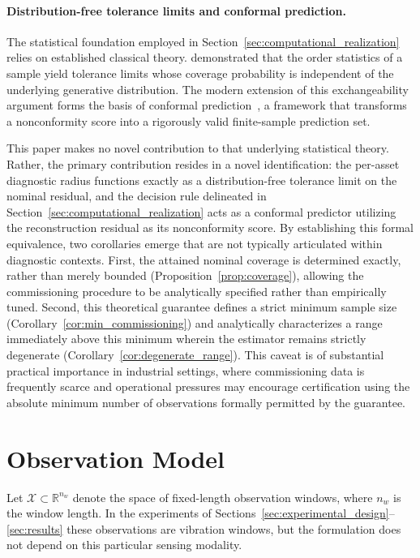\documentclass[a4paper]{cas-sc}
\newcommand{\X}{\ensuremath{\mathcal{X}}}
\newcommand{\R}{\ensuremath{\mathbb{R}}}
\begin{document}
\paragraph{Distribution-free tolerance limits and conformal prediction.}
The statistical foundation employed in Section~\ref{sec:computational_realization} relies on established classical theory. \citet{wilks1941} demonstrated that the order statistics of a sample yield tolerance limits whose coverage probability is independent of the underlying generative distribution. The modern extension of this exchangeability argument forms the basis of conformal prediction~\citep{vovk2005,shafer2008,papadopoulos2002,lei2018}, a framework that transforms a nonconformity score into a rigorously valid finite-sample prediction set.

This paper makes no novel contribution to that underlying statistical theory. Rather, the primary contribution resides in a novel identification: the per-asset diagnostic radius functions exactly as a distribution-free tolerance limit on the nominal residual, and the decision rule delineated in Section~\ref{sec:computational_realization} acts as a conformal predictor utilizing the reconstruction residual as its nonconformity score. By establishing this formal equivalence, two corollaries emerge that are not typically articulated within diagnostic contexts. First, the attained nominal coverage is determined exactly, rather than merely bounded (Proposition~\ref{prop:coverage}), allowing the commissioning procedure to be analytically specified rather than empirically tuned. Second, this theoretical guarantee defines a strict minimum sample size (Corollary~\ref{cor:min_commissioning}) and analytically characterizes a range immediately above this minimum wherein the estimator remains strictly degenerate (Corollary~\ref{cor:degenerate_range}). This caveat is of substantial practical importance in industrial settings, where commissioning data is frequently scarce and operational pressures may encourage certification using the absolute minimum number of observations formally permitted by the guarantee.

\section{Observation Model}
\label{sec:observation_model}

Let \(\X \subset \R^{n_w}\) denote the space of fixed-length observation
windows, where \(n_w\) is the window length. In the experiments of
Sections~\ref{sec:experimental_design}--\ref{sec:results} these observations
are vibration windows, but the formulation does not depend on this
particular sensing modality.
\end{document}
